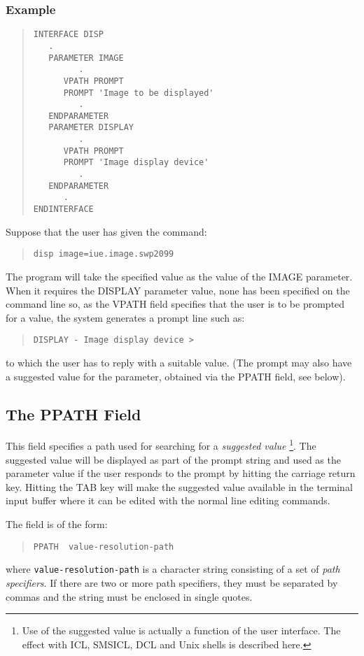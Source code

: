 \documentclass[twoside,11pt]{article}
\newcommand{\xlabel}[1]{}
\renewcommand{\_}{\texttt{\symbol{95}}}
\begin{document}
\subsubsection*{Example}
\begin{quote} \begin{verbatim}
INTERFACE DISP
   .
   PARAMETER IMAGE
         .
      VPATH PROMPT
      PROMPT 'Image to be displayed'
         .
   ENDPARAMETER
   PARAMETER DISPLAY
         .
      VPATH PROMPT
      PROMPT 'Image display device'
         .
   ENDPARAMETER
      .
ENDINTERFACE
\end{verbatim} \end{quote}
Suppose that the user has given the command:
\begin{quote} \begin{verbatim}
disp image=iue.image.swp2099
\end{verbatim} \end{quote}
The program will take the specified value as the value of the IMAGE parameter.
When it requires the DISPLAY parameter value, none has been specified on
the command line so, as the VPATH field specifies that the user is
to be prompted for a value, the system generates a prompt line such 
as:
\begin{quote} \begin{verbatim}
DISPLAY - Image display device >
\end{verbatim} \end{quote}
to which the user has to reply with a suitable value. (The prompt may
also have a suggested value for the parameter, obtained via the PPATH
field, see below).

\subsection{The PPATH Field
\xlabel{the_ppath_field}\label{ppath}}

This field specifies a path used for searching for a {\em suggested value}
\footnote{Use of the suggested value is actually a function of the user 
interface.
The effect with ICL, SMSICL, DCL and Unix shells is described here.}.
The suggested value will be displayed as part of the prompt string and used as 
the parameter value if the user responds to the prompt by hitting the carriage
return key.
Hitting the TAB key will make the suggested value available in the 
terminal input buffer where it can be edited with the normal line editing 
commands.

The field is of the form:
\begin{quote} \begin{verbatim}
PPATH  value-resolution-path
\end{verbatim} \end{quote}
where \texttt{value-resolution-path} is a character string 
consisting of a set of {\em path specifiers}. If there are two or more
path specifiers, they must be separated by commas and the string must be
enclosed in single quotes.
\end{document}
